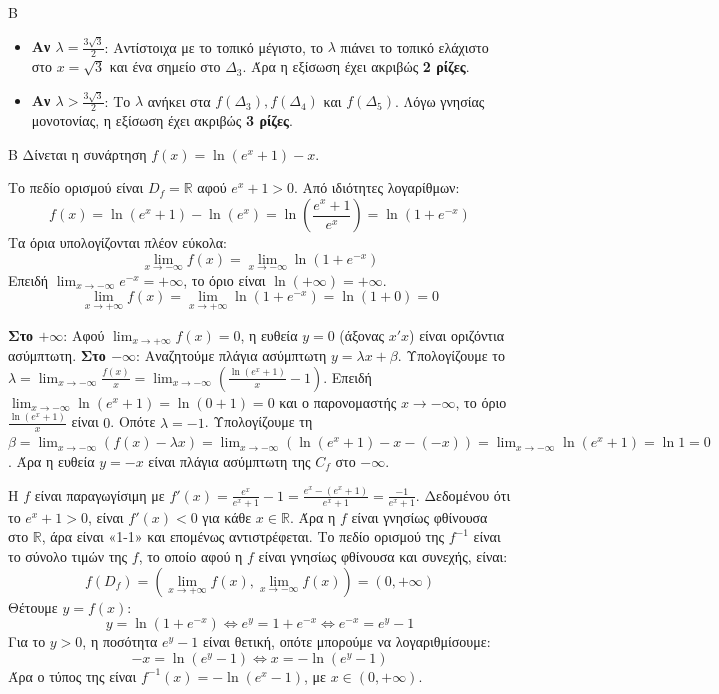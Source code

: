 \begin{thema}{Β}
\begin{erwthma}
\begin{itemize}
    \item \textbf{Αν $\lambda = \frac{3\sqrt{3}}{2}$}: 
    Αντίστοιχα με το τοπικό μέγιστο, το $\lambda$ πιάνει το τοπικό ελάχιστο στο $x = \sqrt{3}$ και ένα σημείο στο $\Delta_3$. Άρα η εξίσωση έχει ακριβώς \textbf{2 ρίζες}.
    
    \item \textbf{Αν $\lambda > \frac{3\sqrt{3}}{2}$}: 
    Το $\lambda$ ανήκει στα $f(\Delta_3), f(\Delta_4)$ και $f(\Delta_5)$. Λόγω γνησίας μονοτονίας, η εξίσωση έχει ακριβώς \textbf{3 ρίζες}.
\end{itemize}
\end{erwthma}
\end{thema}

\begin{thema}{Β}
Δίνεται η συνάρτηση $f(x) = \ln(e^x + 1) - x$.

\begin{erwthma}
\item Το πεδίο ορισμού είναι $D_f = \mathbb{R}$ αφού $e^x+1>0$.
Από ιδιότητες λογαρίθμων:
\[ f(x) = \ln(e^x + 1) - \ln(e^x) = \ln\left( \frac{e^x+1}{e^x} \right) = \ln(1 + e^{-x}) \]
Τα όρια υπολογίζονται πλέον εύκολα:
\[ \lim_{x\to-\infty} f(x) = \lim_{x\to-\infty} \ln(1 + e^{-x}) \]
Επειδή $\lim_{x\to-\infty} e^{-x} = +\infty$, το όριο είναι $\ln(+\infty) = +\infty$.
\[ \lim_{x\to+\infty} f(x) = \lim_{x\to+\infty} \ln(1 + e^{-x}) = \ln(1+0) = 0 \]

\item \textbf{Στο $+\infty$}: 
Αφού $\lim_{x\to+\infty} f(x) = 0$, η ευθεία $y = 0$ (άξονας $x'x$) είναι οριζόντια ασύμπτωτη.
\textbf{Στο $-\infty$}:
Αναζητούμε πλάγια ασύμπτωτη $y = \lambda x + \beta$.
Υπολογίζουμε το $\lambda = \lim_{x\to-\infty} \frac{f(x)}{x} = \lim_{x\to-\infty} \left( \frac{\ln(e^x+1)}{x} - 1 \right)$.
Επειδή $\lim_{x\to-\infty} \ln(e^x+1) = \ln(0+1) = 0$ και ο παρονομαστής $x \to -\infty$, το όριο $\frac{\ln(e^x+1)}{x}$ είναι $0$. Οπότε $\lambda = -1$.
Υπολογίζουμε τη $\beta = \lim_{x\to-\infty} (f(x) - \lambda x) = \lim_{x\to-\infty} (\ln(e^x+1) - x - (-x)) = \lim_{x\to-\infty} \ln(e^x+1) = \ln 1 = 0$.
Άρα η ευθεία $y = -x$ είναι πλάγια ασύμπτωτη της $C_f$ στο $-\infty$.

\item Η $f$ είναι παραγωγίσιμη με $f'(x) = \frac{e^x}{e^x+1} - 1 = \frac{e^x - (e^x+1)}{e^x+1} = \frac{-1}{e^x+1}$.
Δεδομένου ότι το $e^x+1 > 0$, είναι $f'(x) < 0$ για κάθε $x \in \mathbb{R}$.
Άρα η $f$ είναι γνησίως φθίνουσα στο $\mathbb{R}$, άρα είναι «1-1» και επομένως αντιστρέφεται.
Το πεδίο ορισμού της $f^{-1}$ είναι το σύνολο τιμών της $f$, το οποίο αφού η $f$ είναι γνησίως φθίνουσα και συνεχής, είναι:
\[ f(D_f) = \left( \lim_{x\to+\infty} f(x), \lim_{x\to-\infty} f(x) \right) = (0, +\infty) \]
Θέτουμε $y = f(x)$:
\[ y = \ln(1+e^{-x}) \Leftrightarrow e^y = 1+e^{-x} \Leftrightarrow e^{-x} = e^y - 1 \]
Για το $y > 0$, η ποσότητα $e^y - 1$ είναι θετική, οπότε μπορούμε να λογαριθμίσουμε:
\[ -x = \ln(e^y - 1) \Leftrightarrow x = -\ln(e^y-1) \]
Άρα ο τύπος της είναι $f^{-1}(x) = -\ln(e^x - 1)$, με $x \in (0, +\infty)$.


\end{erwthma}
\end{thema}
